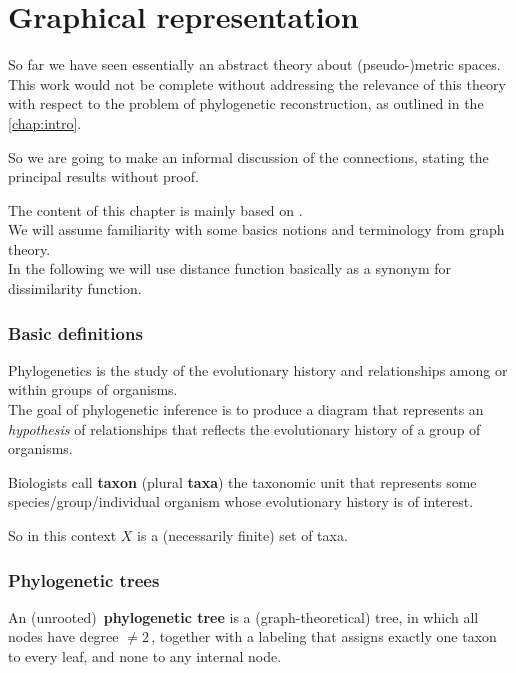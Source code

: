 \documentclass[./main.tex]{subfiles}
\begin{document}
\ifSubfilesClassLoaded{\mainmatter}{}

\chapter{Graphical representation} \label{chap:p2c5}

So far we have seen essentially an abstract theory about (pseudo-)metric spaces. This work would not be complete without addressing the relevance of this theory with respect to the problem of phylogenetic reconstruction, as outlined in the \autoref{chap:intro}.

So we are going to make an informal discussion of the connections, stating the principal results without proof.

The content of this chapter is mainly based on \cite{HRS11}. \\
We will assume familiarity with some basics notions and terminology from graph theory. \\
In the following we will use distance function basically as a synonym for dissimilarity function.\bigskip


\subsection*{Basic definitions}

Phylogenetics is the study of the evolutionary history and relationships among or within groups of organisms. \\
The goal of phylogenetic inference is to produce a diagram that represents an \emph{hypothesis} of relationships that reflects the evolutionary history of a group of organisms.

Biologists call \textbf{taxon} (plural \textbf{taxa}) the taxonomic unit that represents some species/group/individual organism whose evolutionary history is of interest.

So in this context $X$ is a (necessarily finite) set of taxa.\bigskip


\subsection*{Phylogenetic trees}

An (unrooted)\footnotemark\ \textbf{phylogenetic tree} is a (graph-theoretical) tree, in which all nodes have degree $\neq 2 \,$, together with a labeling that assigns exactly one taxon to every leaf, and none to any internal node.
\end{document}
